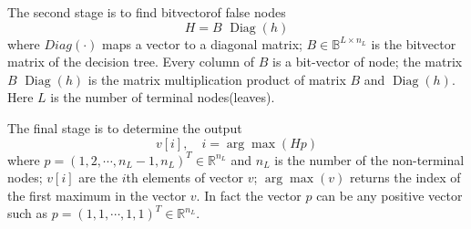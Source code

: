 \documentclass[UTF8]{article}
\begin{document}
The second stage is to find bitvector\footnotemark of false nodes
\begin{equation}H=B\, \,\operatorname{Diag}(h)\end{equation}
where  $Diag(\cdot)$ maps a vector to a diagonal matrix;
$B\in\mathbb{B}^{L\times n_L}$ is the bitvector matrix of the decision tree.
Every column of $B$ is a bit-vector of node; the matrix $B\, \,\operatorname{Diag}(h)$
is the matrix multiplication product of matrix $B$  and $\operatorname{Diag}(h)$.
Here $L$ is the number of terminal nodes(leaves).


The final stage is to determine the output
\begin{equation}v[i],\quad
i=\arg\max(Hp)\end{equation}
where $p=(1, 2, \cdots, n_L-1, n_L)^T\in\mathbb{R}^{n_L}$ and $n_L$ is the number of the non-terminal nodes;
$v[i]$ are the $i$th elements of vector $v$; $\arg\max(v)$ returns the index of the first maximum in the vector $v$.
In fact the vector $p$ can be any positive vector such as $p=(1, 1, \cdots, 1,1)^T\in\mathbb{R}^{n_L}$.
\end{document}
